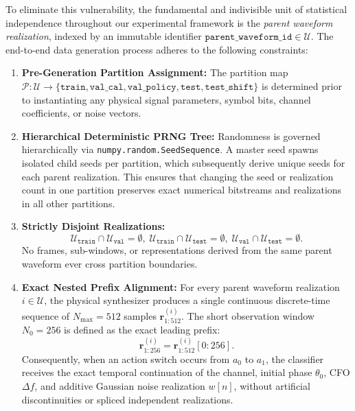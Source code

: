 To eliminate this vulnerability, the fundamental and indivisible unit of statistical independence throughout our experimental framework is the \emph{parent waveform realization}, indexed by an immutable identifier $\texttt{parent\_waveform\_id} \in \mathcal{U}$. The end-to-end data generation process adheres to the following constraints:
\begin{enumerate}
    \item \textbf{Pre-Generation Partition Assignment:} The partition map $\mathcal{P}: \mathcal{U} \to \{\texttt{train}, \allowbreak \texttt{val\_cal}, \allowbreak \texttt{val\_policy}, \allowbreak \texttt{test}, \allowbreak \texttt{test\_shift}\}$ is determined prior to instantiating any physical signal parameters, symbol bits, channel coefficients, or noise vectors.
    \item \textbf{Hierarchical Deterministic PRNG Tree:} Randomness is governed hierarchically via \texttt{numpy.random.SeedSequence}. A master seed spawns isolated child seeds per partition, which subsequently derive unique seeds for each parent realization. This ensures that changing the seed or realization count in one partition preserves exact numerical bitstreams and realizations in all other partitions.
    \item \textbf{Strictly Disjoint Realizations:} 
    \begin{equation}
        \mathcal{U}_{\texttt{train}} \cap \mathcal{U}_{\texttt{val}} = \emptyset,\;
        \mathcal{U}_{\texttt{train}} \cap \mathcal{U}_{\texttt{test}} = \emptyset,\;
        \mathcal{U}_{\texttt{val}} \cap \mathcal{U}_{\texttt{test}} = \emptyset.
    \end{equation}
    No frames, sub-windows, or representations derived from the same parent waveform ever cross partition boundaries.
    \item \textbf{Exact Nested Prefix Alignment:} For every parent waveform realization $i \in \mathcal{U}$, the physical synthesizer produces a single continuous discrete-time sequence of $N_{\max} = 512$ samples $\mathbf{r}^{(i)}_{1:512}$. The short observation window $N_0 = 256$ is defined as the exact leading prefix:
    \begin{equation}
        \mathbf{r}^{(i)}_{1:256} = \mathbf{r}^{(i)}_{1:512}[0:256].
    \end{equation}
    Consequently, when an action switch occurs from $a_0$ to $a_1$, the classifier receives the exact temporal continuation of the channel, initial phase $\theta_0$, CFO $\Delta f$, and additive Gaussian noise realization $w[n]$, without artificial discontinuities or spliced independent realizations.
\end{enumerate}

